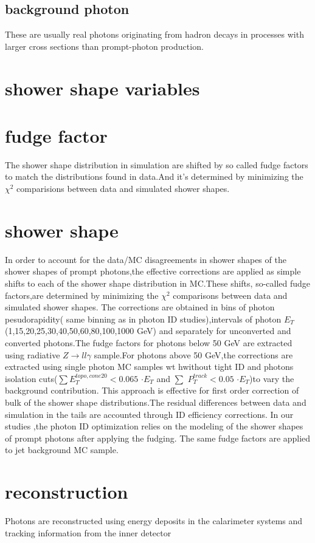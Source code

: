 \documentclass{ctexart}
\begin{document}
\subsection{background photon}
These are usually real photons originating from
hadron decays in processes with larger cross sections than
prompt-photon production.
\section{shower shape variables}

\section{fudge factor}
The shower shape distribution in simulation  are shifted by so called fudge factors to match the distributions found in data.And it's determined by minimizing the $\chi^2$ comparisions between data and simulated shower shapes.
\section{shower shape}
In order to account for the data/MC disagreements in shower shapes of the shower shapes of prompt photons,the effective corrections are applied as simple shifts to each of the shower shape distribution in MC.These shifts, so-called fudge factors,are determined by minimizing the  $\chi^2$ comparisons between data and simulated shower shapes. The corrections are obtained in bins of photon pesudorapidity( same binning as in photon ID studies),intervals of photon $E_T$(1,15,20,25,30,40,50,60,80,100,1000 GeV) and separately for unconverted and converted photons.The fudge factors for photons below 50 GeV are extracted using radiative $Z\rightarrow ll\gamma$ sample.For photons above 50 GeV,the corrections are extracted using single photon MC samples wt hwithout tight ID and photons isolation cuts($\sum E_T^{topo,cone20}<0.065$ $\cdot E_T$   and $ \sum $ $P_T^{track}<0.05$ $\cdot E_T$)to vary the background contribution. This approach is effective for first order correction of bulk of the shower shape distributions.The residual differences between data and simulation in the tails are accounted through ID efficiency corrections. In our studies ,the photon ID optimization relies on the modeling of the shower shapes of prompt photons after applying the fudging. The same fudge factors are applied to jet background MC sample.
\section{reconstruction}
Photons are reconstructed using energy deposits in the calarimeter systems and tracking information from the inner detector
\end{document}
